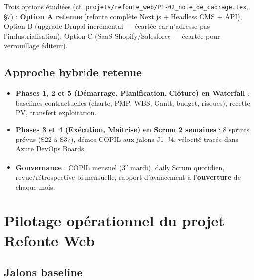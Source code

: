 \documentclass[11pt,a4paper,oneside]{report}
\begin{document}
\vspace{4pt}
\begin{decision}
Trois options étudiées (cf.\ \texttt{projets/refonte\_web/P1-02\_note\_de\_cadrage.tex}, §7) : \textbf{Option A retenue} (refonte complète Next.js + Headless CMS + API), Option B (upgrade Drupal incrémental --- écartée car n'adresse pas l'industrialisation), Option C (SaaS Shopify/Salesforce --- écartée pour verrouillage éditeur).
\end{decision}

\section{Approche hybride retenue}

\begin{itemize}
  \item \textbf{Phases 1, 2 et 5 (Démarrage, Planification, Clôture) en Waterfall} : baselines contractuelles (charte, PMP, WBS, Gantt, budget, risques), recette PV, transfert exploitation.
  \item \textbf{Phases 3 et 4 (Exécution, Maîtrise) en Scrum 2 semaines} : 8 sprints prévus (S22 à S37), démos COPIL aux jalons J1--J4, vélocité tracée dans Azure DevOps Boards.
  \item \textbf{Gouvernance} : COPIL mensuel (3\textsuperscript{e} mardi), daily Scrum quotidien, revue/rétrospective bi-mensuelle, rapport d'avancement à l'\textbf{ouverture} de chaque mois.
\end{itemize}

\newpage

\chapter{Pilotage opérationnel du projet Refonte Web}

\section{Jalons baseline}
\end{document}
